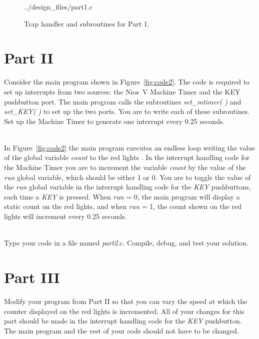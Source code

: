 \documentclass[epsfig,10pt,fullpage]{article}
\begin{document}
\begin{figure}[t]
\begin{center}
\begin{minipage}[h]{14.5 cm}
 
{../design_files/part1.c}
\caption{Trap handler and subroutines for Part 1.}
\label{fig:trap}
\end{minipage}
\end{center}
\end{figure}

\section*{ Part II}
Consider the main program shown in Figure~\ref{fig:code2}. The code is required to set up 
interrupts from two sources: the Nios~V Machine Timer and the KEY pushbutton port. The main
program calls the subroutines {\it set\_mtimer( )} and {\it set\_KEY( )} to set up the two ports. 
You are to write each of these subroutines. Set up the Machine Timer to generate one interrupt
every 0.25 seconds.

~\\
In Figure~\ref{fig:code2} the main program executes an endless loop writing the value of
the global variable {\it count} to the red lights .
In the interrupt handling code for 
the Machine Timer you are to increment the variable {\it count} by the value of the 
{\it run} global variable, which should be either 1 or 0. You are to toggle the value of the
{\it run} global variable in the interrupt handling code for the {\it KEY} pushbuttons, each time 
a {\it KEY} is pressed. When {\it run} = 0, the main program will display a static count on the 
red lights, and when {\it run} = 1, the count shown on the red lights will increment every 
0.25 seconds.

~\\
Type your code in a file named {\it part2}.c. Compile, debug, and test your solution.

\section*{ Part III}
Modify your program from Part II so that you can vary the speed at which the counter
displayed on the red lights is incremented. All of your changes for this part should be made
in the interrupt handling code for the {\it KEY} pushbutton. The main program and the rest of
your code should not have to be changed.
\end{document}
